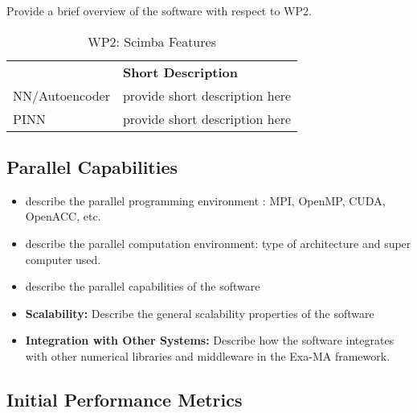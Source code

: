 Provide a brief overview of the software with respect to WP2.

\begin{table}[h!]
    \centering
    { 
        \setlength{\parindent}{0pt}
        \def\arraystretch{1.25}
        {
            \fontsize{9}{11}\selectfont
            \begin{tabular}{!{\color{numpexgray}\vrule}p{.25\linewidth}!{\color{numpexgray}\vrule}p{.6885\linewidth}!{\color{numpexgray}\vrule}}
    
     &  {\rule{0pt}{2.5ex}\color{white}\bf Short Description }\\ 
    
    NN/Autoencoder & provide short description here \\
    PINN & provide short description here \\
\end{tabular}
        }
    }
    \caption{WP2: Scimba Features}
\end{table}


\subsection{Parallel Capabilities}
\label{sec:WP2:Scimba:performances}


\begin{itemize}
    \item describe the parallel programming  environment : MPI, OpenMP, CUDA, OpenACC, etc.
    \item describe the parallel computation environment: type of architecture and super computer used.
    \item describe the parallel capabilities of the software
    \item \textbf{Scalability:} Describe the general scalability properties of the software
    \item \textbf{Integration with Other Systems:} Describe how the software integrates with other numerical libraries and middleware in the Exa-MA framework.
\end{itemize}

\subsection{Initial Performance Metrics}
\label{sec:WP2:Scimba:metrics}

